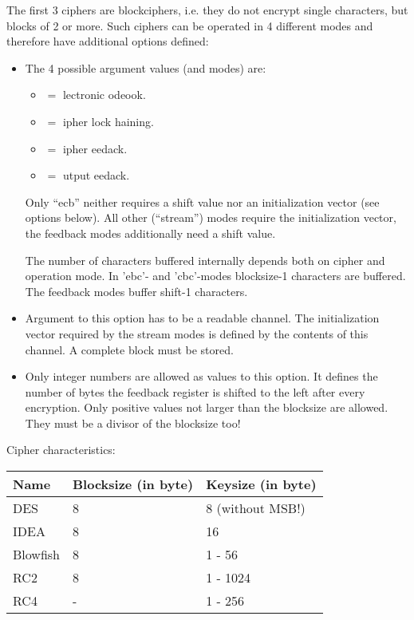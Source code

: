 The first 3 ciphers are blockciphers, i.e. they do not encrypt single
characters, but blocks of 2 or more. Such ciphers can be operated in 4
different modes and therefore have additional options defined:

\begin {itemize}
\item[-mode]	The 4 possible argument values (and modes) are:
	\begin {itemize}
	\item[ecb]	$=$ lectronic odeook.
	\item[cbc]	$=$ ipher lock haining.
	\item[cfb]	$=$ ipher eedack.
	\item[ofb]	$=$ utput eedack.
	\end   {itemize}

	Only ``ecb'' neither requires a shift value nor an initialization
	vector (see options below). All other (``stream'') modes require
	the initialization vector, the feedback modes additionally
	need a shift value.

	The number of characters buffered internally depends both on
	cipher and operation mode.
	In 'ebc'- and 'cbc'-modes blocksize-1 characters are buffered.
	The feedback modes buffer shift-1 characters.


\item[-iv]	Argument to this option has to be a readable
		channel. The initialization vector required by the
		stream modes is defined by the contents of this
		channel. A complete block must be stored.

\item[-shift]	Only integer numbers are allowed as values to this
		option. It defines the number of bytes the feedback
		register is shifted to the left after every
		encryption. Only positive values not larger than the
		blocksize are allowed. They must be a divisor of the
		blocksize too!
\end   {itemize}


Cipher characteristics:

\begin {center}
	\begin {tabular}{|l|l|l|}\hline
	Name		& Blocksize (in byte)	& Keysize (in byte) \\ \hline\hline
	DES		& 8			& 8 (without MSB!) \\ \hline
	IDEA		& 8			& 16 \\ \hline
	Blowfish	& 8			& 1 - 56 \\ \hline\hline
	RC2		& 8			& 1 - 1024\footnotemark{a} \\ \hline
	RC4		& -			& 1 - 256 \\ \hline
	\end   {tabular}
\end   {center}


